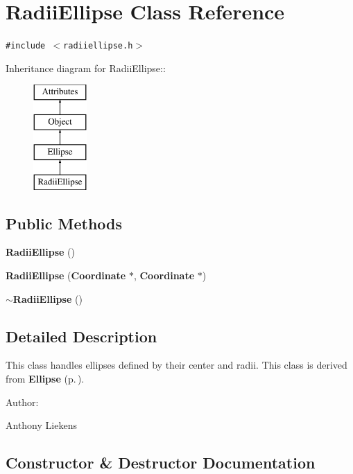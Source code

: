 \section{Radii\-Ellipse Class Reference}
\label{classRadiiEllipse}
{\tt \#include $<$radiiellipse.h$>$}

Inheritance diagram for Radii\-Ellipse::\begin{figure}[H]
\begin{center}
\leavevmode
\includegraphics[height=4cm]{classRadiiEllipse}
\end{center}
\end{figure}
\subsection*{Public Methods}
\begin{CompactItemize}
\item 
{\bf Radii\-Ellipse} ()
\item 
{\bf Radii\-Ellipse} ({\bf Coordinate} $\ast$, {\bf Coordinate} $\ast$)
\item 
{\bf $\sim$Radii\-Ellipse} ()
\end{CompactItemize}


\subsection{Detailed Description}
This class handles ellipses defined by their center and radii. This class is derived from {\bf Ellipse} {\rm (p.\,\pageref{classEllipse})}. \begin{Desc}
\item[Author: ]\par
Anthony Liekens \end{Desc}




\subsection{Constructor \& Destructor Documentation}
